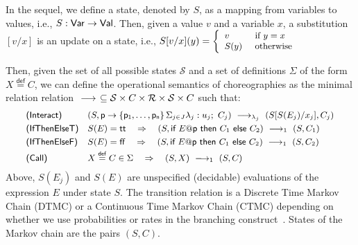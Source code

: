 \bigskip


 In the sequel, we define a state, denoted by $S$,
as a mapping from variables to values, i.e.,
$S: \mathsf{Var} \rightarrow\mathsf{Val}$. Then, given a value $v$ and a variable $x$,
a substitution $[v/x]$ is an update on a state, i.e.,
$\small S[v/x] (y)= \left\{
  \begin{array}{ll} 
    v    & \text{ if } y=x\\ 
    S(y) & \text{ otherwise}
  \end{array} \right.
$

Then, given the set of all possible states $\mathcal S$ and a set of
definitions $\Sigma$ of the form $X\stackrel{\mathsf{def}}{=} C$, we
can define the operational semantics of choreographies as the minimal
relation relation
$\ \longrightarrow_{}\ \subseteq \mathcal S\times C\times \mathcal R\times \mathcal
S\times C$ such that:
\begin{displaymath}\small
  \begin{array}{l@{\quad}llll}
    \textsf{(Interact)} &
    (S, \interact{p}{\role p_1,\ldots,\role p_n}) 
    \red{\lambda_j}
    (S[S(E_j)/x_j], C_j) 
    \\[1mm]
    \textsf{(IfThenElseT)} &
    S(E) = \mathsf{tt} \quad\Rightarrow\quad
    (S,\ifTE {E}{p}{C_1}{C_2}) 
    \red{1}
    (S, C_1)
    \\[1mm]
    \textsf{(IfThenElseF)} &
    S(E) = \mathsf{ff} \quad\Rightarrow\quad
    (S,\ifTE {E}{p}{C_1}{C_2}) 
    \red{1}
    (S, C_2)
    \\[1mm]
    \textsf{(Call)} &
    X\stackrel{\mathsf{def}}{=} C\in\Sigma \quad\Rightarrow\quad (S, X) \red{1}(S,C)
  \end{array}
\end{displaymath}
Above, $S(E_j)$ and $S(E)$ are unspecified (decidable) evaluations of
the expression $E$ under state $S$. The transition relation is a
Discrete Time Markov Chain (DTMC) or a Continuous Time Markov Chain
(CTMC) depending on whether we use probabilities or rates in the
branching construct~\cite{ctmc}. States of the Markov chain are the
pairs $(S,C)$.
%

